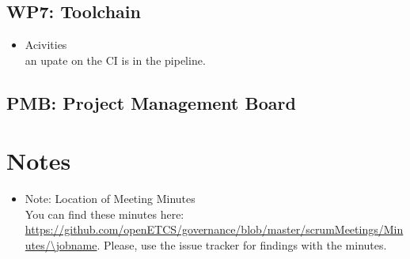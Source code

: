 \documentclass[a4paper, 11pt]{article}
\begin{document}
\subsection{WP7: Toolchain}

\begin{itemize}
\item Acivities\\
 an upate on the CI is in the pipeline.
\end{itemize}

\subsection{PMB: Project Management Board}



\section{Notes}


\begin{itemize}

\item Note: Location of Meeting Minutes\\
You can find these minutes here: \url{https://github.com/openETCS/governance/blob/master/scrumMeetings/Minutes/\jobname}. Please, use the issue tracker for findings with the minutes.

\end{itemize}
\end{document}
